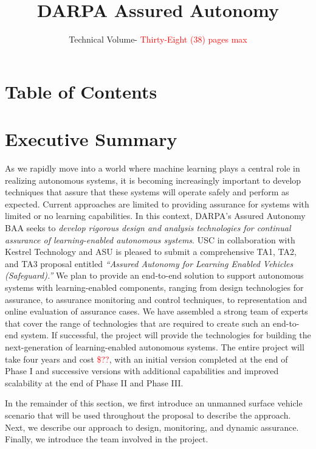 \documentclass[12pt]{dod-blank}
\title{DARPA Assured Autonomy}
\author{Technical Volume- \textcolor{red}{Thirty-Eight (38) pages max}}
\begin{document}


\newpage
\section{Table of Contents}
\tableofcontents

\newpage
{}
\section{Executive Summary}
As we rapidly move into a world where machine learning plays a central role in realizing autonomous systems, it is becoming increasingly important to develop techniques that assure that these systems will operate safely and perform as expected. Current approaches are limited to providing assurance for systems with limited or no  learning capabilities. In this context, DARPA's Assured Autonomy BAA seeks to \emph{develop rigorous design and analysis technologies for continual assurance of learning-enabled autonomous systems}. USC in collaboration with Kestrel Technology and ASU is pleased to submit a comprehensive TA1, TA2, and TA3 proposal entitled \emph{``Assured Autonomy for Learning Enabled Vehicles (Safeguard).''} We plan to provide an end-to-end solution to support autonomous systems with learning-enabled components, ranging from design technologies for assurance, to assurance monitoring and control techniques, to representation and online evaluation of assurance cases. We have assembled a strong team of experts that cover the range of technologies that are required to create such an end-to-end system. If successful, the project will provide the technologies for building the next-generation of learning-enabled autonomous systems.  The entire project will take four years and cost \textcolor{red}{\$??}, with an initial version completed at the end of Phase I and successive versions with additional capabilities and improved scalability at the end of Phase II and Phase III.  

In the remainder of this section, we first introduce an  unmanned surface vehicle scenario that will be used throughout the proposal to describe the approach.  Next, we describe our approach to design, monitoring, and dynamic assurance. Finally, we introduce the team involved in the project. 
\end{document}
